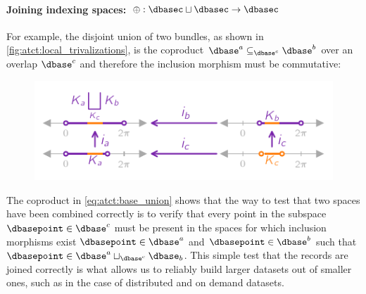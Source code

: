\documentclass[journal]{IEEEtran}
\theoremstyle{definition}
\theoremstyle{remark}
\begin{document}
\paragraph{Joining indexing spaces: $\oplus: \mathcal{\dbasec} \sqcup \mathcal{\dbasec} \rightarrow \mathcal{\dbasec}$}
For example, the disjoint union of two bundles, as shown in \autoref{fig:atct:local_trivalizations}, is the coproduct $\dbase^{a} \subseteq_{\dbase^{c}} \dbase^{b}$ over an overlap $\dbase^{c}$ and therefore the inclusion morphism must be commutative:
\begin{figure}
  \includegraphics*[width=1\columnwidth]{figures/tex/k_coproduct.pdf}
\end{figure}

The coproduct in \autoref{eq:atct:base_union} shows that the way to test that two spaces have been combined correctly is to verify that every point in the subspace $\dbasepoint \in \dbase^{c}$ must be present in the spaces for which inclusion morphisms exist $\dbasepoint \in \dbase^{a}$ and $\dbasepoint \in \dbase^{b}$ such that $\dbasepoint \in \dbase^{a}\sqcup_{\dbase^{c}} \dbase_{b}$. This simple test that the records are joined correctly is what allows us to reliably build larger datasets out of smaller ones, such as in the case of distributed and on demand datasets.
\end{document}
